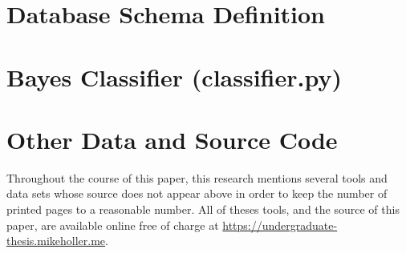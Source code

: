 \newpage \appendix \appendixpage \addappheadtotoc
\section{Database Schema Definition}
\label{appendix:a}


\section{\Naive Bayes Classifier (classifier.py)}
\label{appendix:b}


\section{Other Data and Source Code}

Throughout the course of this paper, this research mentions several tools and data sets whose source does not appear above in order to keep the number of printed pages to a reasonable number.
All of theses tools, and the source of this paper, are available online free of charge at \url{https://undergraduate-thesis.mikeholler.me}.